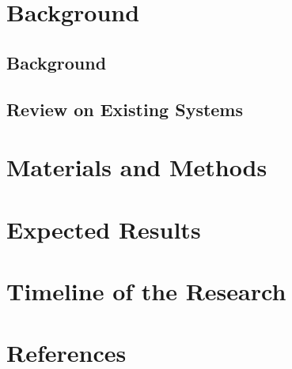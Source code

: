 \documentclass{article}
\begin{document}
\section{Background}
\subsection{Background}

\subsection{Review on Existing Systems}


\section{Materials and Methods}


\section{Expected Results}


\section{Timeline of the Research}



\section{References}
\end{document}
